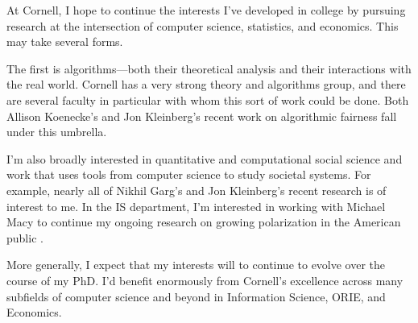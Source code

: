\documentclass{grad-statement}
\begin{document}
At Cornell, I hope to continue the interests I've developed in college by pursuing research at the intersection of computer science, statistics, and economics.
This may take several forms.

The first is algorithms---both their theoretical analysis and their interactions with the real world.
Cornell has a very strong theory and algorithms group, and there are several faculty in particular with whom this sort of work could be done.
Both Allison Koenecke's and Jon Kleinberg's recent work on algorithmic fairness fall under this umbrella.

I'm also broadly interested in quantitative and computational social science and work that uses tools from computer science to study societal systems.
For example, nearly all of Nikhil Garg's and Jon Kleinberg's recent research is of interest to me.
In the IS department, I'm interested in working with Michael Macy to continue my ongoing research on growing polarization in the American public .

\medskip

More generally, I expect that my interests will to continue to evolve over the course of my PhD.
I'd benefit enormously from Cornell's excellence across many subfields of computer science and beyond in Information Science, ORIE, and Economics.
\end{document}
